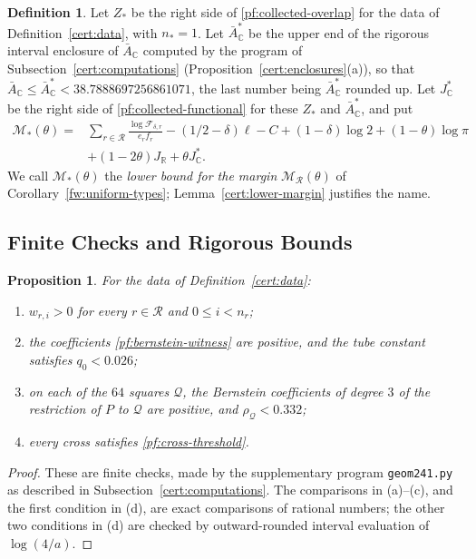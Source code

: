 \documentclass[11pt]{amsart}
\numberwithin{equation}{section}
\newtheorem{proposition}[equation]{Proposition}
\theoremstyle{definition}
\newtheorem{definition}[equation]{Definition}
\theoremstyle{remark}
\newcommand{\R}{\mathbb R}
\newcommand{\C}{\mathbb C}
\begin{document}
\begin{definition}\label{cert:lower-bounds}
Let $Z_*$ be the right side of \eqref{pf:collected-overlap} for the data
of Definition~\ref{cert:data}, with $n_*=1$. Let $\bar A_\C^*$ be the
upper end of the rigorous interval enclosure of $\bar A_\C$ computed by
the program of Subsection~\ref{cert:computations}
(Proposition~\ref{cert:enclosures}(a)), so that
$\bar A_\C\le\bar A_\C^*<38.7888697256861071$, the last number being
$\bar A_\C^*$ rounded up. Let
$J_\C^*$ be the right side of \eqref{pf:collected-functional} for these
$Z_*$ and $\bar A_\C^*$, and put
\[
 \begin{split}
 \mathcal M_*(\theta)={}&\sum_{r\in\mathcal R}
 \frac{\log\mathcal F_{\delta,r}}{e_rf_r}
 -(1/2-\delta)\ell-C+(1-\delta)\log2+(1-\theta)\log\pi\\
 &+(1-2\theta)J_\R+\theta J_\C^* .
 \end{split}
\]
We call $\mathcal M_*(\theta)$ the \emph{lower bound for the margin}
$\mathcal M_{\mathcal R}(\theta)$ of Corollary~\ref{fw:uniform-types};
Lemma~\ref{cert:lower-margin} justifies the name.
\end{definition}

\subsection{Finite Checks and Rigorous Bounds}

\begin{proposition}\label{cert:exact}
For the data of Definition~\ref{cert:data}:
\begin{enumerate}
\item[(a)] $w_{r,i}>0$ for every $r\in\mathcal R$ and $0\le i<n_r$;
\item[(b)] the coefficients \eqref{pf:bernstein-witness} are positive,
and the tube constant satisfies $q_0<0.026$;
\item[(c)] on each of the $64$ squares $\mathcal Q$, the Bernstein
coefficients of degree $3$ of the restriction of $P$ to $\mathcal Q$ are
positive, and $\rho_{\mathcal Q}<0.332$;
\item[(d)] every cross satisfies \eqref{pf:cross-threshold}.
\end{enumerate}
\end{proposition}

\begin{proof}
These are finite checks, made by the supplementary program
\texttt{geom241.py} as described in Subsection~\ref{cert:computations}.
The comparisons in (a)--(c), and the first condition in (d), are exact
comparisons of rational numbers; the other two conditions in (d) are
checked by outward-rounded interval evaluation of $\log(4/a)$.
\end{proof}
\end{document}
